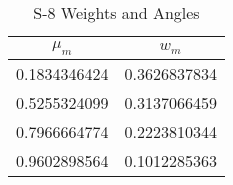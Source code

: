 
\begin{table}[h!]
    \caption{S-8 Weights and Angles}
    \label{tb:s8quad}
    \centering
    \begin{tabular}{cc}
        \toprule
        $\mu_m$ & $w_m$ \\
        \midrule
        0.1834346424 & 0.3626837834 \\
        0.5255324099 & 0.3137066459 \\
        0.7966664774 & 0.2223810344 \\
        0.9602898564 & 0.1012285363 \\
        \bottomrule
    \end{tabular}
\end{table}